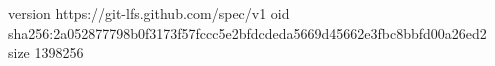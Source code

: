 version https://git-lfs.github.com/spec/v1
oid sha256:2a052877798b0f3173f57fccc5e2bfdcdeda5669d45662e3fbc8bbfd00a26ed2
size 1398256
